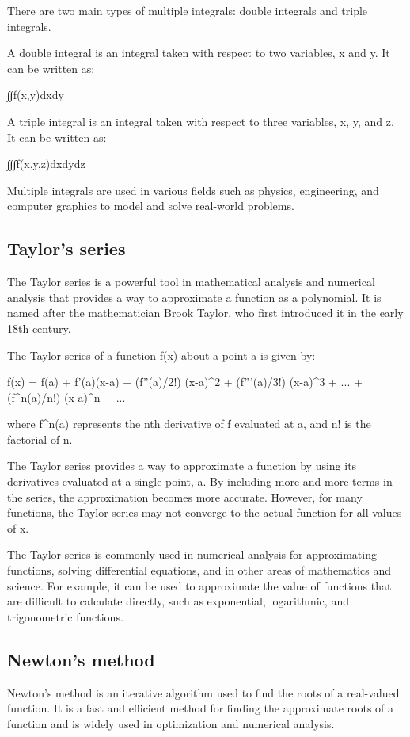 \documentclass[12pt, a4paper, oneside]{article}
\begin{document}
There are two main types of multiple integrals: double integrals and triple integrals.

A double integral is an integral taken with respect to two variables, x and y. It can be written as:

∫∫f(x,y)dxdy

A triple integral is an integral taken with respect to three variables, x, y, and z. It can be written as:

∫∫∫f(x,y,z)dxdydz

Multiple integrals are used in various fields such as physics, engineering, and computer graphics to model and solve real-world problems.

\subsection{ Taylor’s series }
The Taylor series is a powerful tool in mathematical analysis and numerical analysis that provides a way to approximate a function as a polynomial. It is named after the mathematician Brook Taylor, who first introduced it in the early 18th century.

The Taylor series of a function f(x) about a point a is given by:

f(x) = f(a) + f'(a)(x-a) + (f''(a)/2!) (x-a)^2 + (f'''(a)/3!) (x-a)^3 + ... + (f^n(a)/n!) (x-a)^n + ...

where f^n(a) represents the nth derivative of f evaluated at a, and n! is the factorial of n.

The Taylor series provides a way to approximate a function by using its derivatives evaluated at a single point, a. By including more and more terms in the series, the approximation becomes more accurate. However, for many functions, the Taylor series may not converge to the actual function for all values of x.

The Taylor series is commonly used in numerical analysis for approximating functions, solving differential equations, and in other areas of mathematics and science. For example, it can be used to approximate the value of functions that are difficult to calculate directly, such as exponential, logarithmic, and trigonometric functions.




\subsection{ Newton’s method }
Newton's method is an iterative algorithm used to find the roots of a real-valued function. It is a fast and efficient method for finding the approximate roots of a function and is widely used in optimization and numerical analysis.
\end{document}
